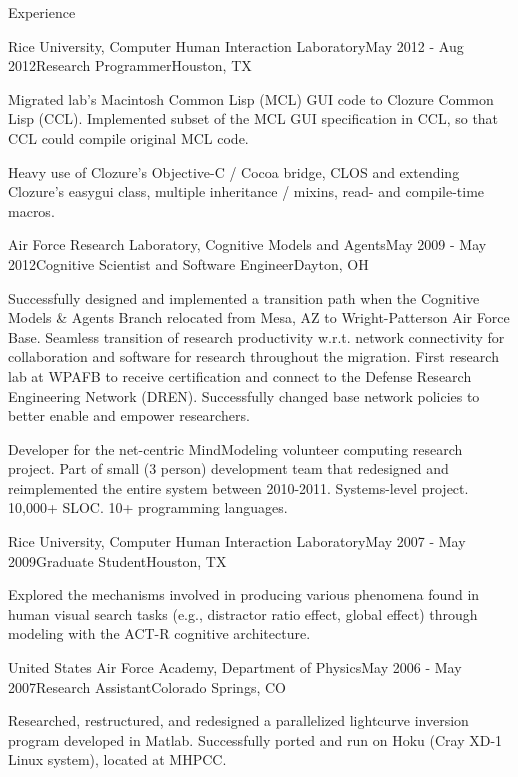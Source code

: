 
\begin{rSection}{Experience}

\begin{rSubsection}{Rice University, Computer Human Interaction Laboratory}{May 2012 - Aug 2012}{Research Programmer}{Houston, TX}
\item Migrated lab's Macintosh Common Lisp (MCL) GUI code to Clozure Common Lisp (CCL).
  Implemented subset of the MCL GUI specification in CCL, so that CCL could compile original MCL code.
\item Heavy use of Clozure's Objective-C / Cocoa bridge, CLOS and extending Clozure's easygui class, multiple inheritance / mixins, read- and compile-time macros.
\end{rSubsection}

\begin{rSubsection}{Air Force Research Laboratory, Cognitive Models and Agents}{May 2009 - May 2012}{Cognitive Scientist and Software Engineer}{Dayton, OH}
\item Successfully designed and implemented a transition path when the Cognitive Models \& Agents Branch relocated from Mesa, AZ to Wright-Patterson Air Force Base. 
Seamless transition of research productivity w.r.t. network connectivity for collaboration and software for research throughout the migration.
First research lab at WPAFB to receive certification and connect to the Defense Research Engineering Network (DREN).
Successfully changed base network policies to better enable and empower researchers.
\end{rSubsection}
\item Developer for the net-centric MindModeling volunteer computing research project.
Part of small (3 person) development team that redesigned and reimplemented the entire system between 2010-2011.
Systems-level project. 10,000+ SLOC. 10+ programming languages.

\begin{rSubsection}{Rice University, Computer Human Interaction Laboratory}{May 2007 - May 2009}{Graduate Student}{Houston, TX}
\item Explored the mechanisms involved in producing various phenomena found in human visual search tasks
(e.g., distractor ratio effect, global effect) through modeling with the ACT-R cognitive architecture. 
\end{rSubsection}

\begin{rSubsection}{United States Air Force Academy, Department of Physics}{May 2006 - May 2007}{Research Assistant}{Colorado Springs, CO}
\item Researched, restructured, and redesigned a parallelized lightcurve inversion program developed in Matlab.
Successfully ported and run on Hoku (Cray XD-1 Linux system), located at MHPCC.
\end{rSubsection}


\end{rSection}
